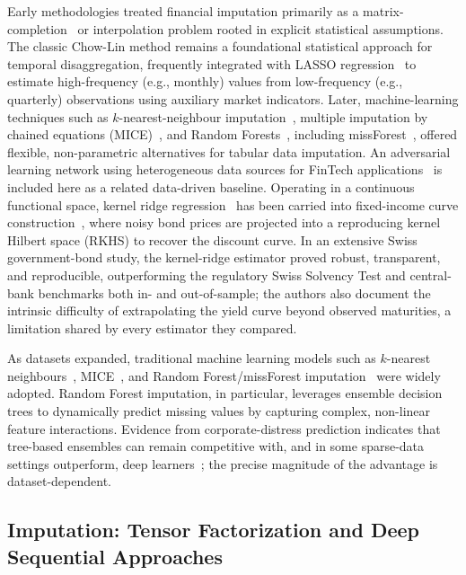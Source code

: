 Early methodologies treated financial imputation primarily as a matrix-completion~\citep{candes2009exact} or interpolation problem rooted in explicit statistical assumptions. The classic Chow-Lin method \citep{chow1971} remains a foundational statistical approach for temporal disaggregation, frequently integrated with LASSO regression~\citep{tibshirani1996regression} to estimate high-frequency (e.g., monthly) values from low-frequency (e.g., quarterly) observations using auxiliary market indicators. Later, machine-learning techniques such as $k$-nearest-neighbour imputation~\citep{troyanskaya2001missing}, multiple imputation by chained equations (MICE)~\citep{vanbuuren1999multiple}, and Random Forests~\citep{breiman2001random}, including missForest~\citep{stekhoven2012}, offered flexible, non-parametric alternatives for tabular data imputation. An adversarial learning network using heterogeneous data sources for FinTech applications~\citep{NDDP} is included here as a related data-driven baseline. Operating in a continuous functional space, kernel ridge regression~\citep{saunders1998dual,aronszajn1950theory} has been carried into fixed-income curve construction~\citep{smith2020}, where noisy bond prices are projected into a reproducing kernel Hilbert space (RKHS) to recover the discount curve. In an extensive Swiss government-bond study, the kernel-ridge estimator proved robust, transparent, and reproducible, outperforming the regulatory Swiss Solvency Test and central-bank benchmarks both in- and out-of-sample; the authors also document the intrinsic difficulty of extrapolating the yield curve beyond observed maturities, a limitation shared by every estimator they compared.

As datasets expanded, traditional machine learning models such as $k$-nearest neighbours~\citep{troyanskaya2001missing}, MICE~\citep{vanbuuren1999multiple}, and Random Forest/missForest imputation~\citep{breiman2001random,stekhoven2012} were widely adopted. Random Forest imputation, in particular, leverages ensemble decision trees to dynamically predict missing values by capturing complex, non-linear feature interactions. Evidence from corporate-distress prediction indicates that tree-based ensembles can remain competitive with, and in some sparse-data settings outperform, deep learners~\citep{sideras2024bankruptcy}; the precise magnitude of the advantage is dataset-dependent.

\subsection{Imputation: Tensor Factorization and Deep Sequential Approaches}

